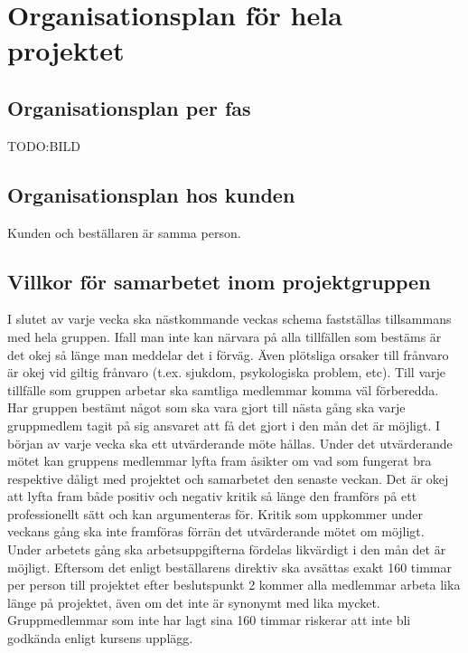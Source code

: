 \documentclass{article}
\begin{document}
\section{Organisationsplan för hela projektet}

\subsection{Organisationsplan per fas}
TODO:BILD

\subsection{Organisationsplan hos kunden}
Kunden och beställaren är samma person.

\subsection{Villkor för samarbetet inom projektgruppen}
I slutet av varje vecka ska nästkommande veckas schema fastställas tillsammans med hela gruppen. Ifall man inte kan närvara på alla tillfällen som bestäms är det okej så länge man meddelar det i förväg. Även plötsliga orsaker till frånvaro är okej vid giltig frånvaro (t.ex. sjukdom, psykologiska problem, etc).
\newline\newline
Till varje tillfälle som gruppen arbetar ska samtliga medlemmar komma väl förberedda. Har gruppen bestämt något som ska vara gjort till nästa gång ska varje gruppmedlem tagit på sig ansvaret att få det gjort i den mån det är möjligt.
\newline\newline
I början av varje vecka ska ett utvärderande möte hållas. Under det utvärderande mötet kan gruppens medlemmar lyfta fram åsikter om vad som fungerat bra respektive dåligt med projektet och samarbetet den senaste veckan. Det är okej att lyfta fram både positiv och negativ kritik så länge den framförs på ett professionellt sätt och kan argumenteras för. Kritik som uppkommer under veckans gång ska inte framföras förrän det utvärderande mötet om möjligt.
\newline\newline
Under arbetets gång ska arbetsuppgifterna fördelas likvärdigt i den mån det är möjligt. Eftersom det enligt beställarens direktiv ska avsättas exakt 160 timmar per person till projektet efter beslutspunkt 2 kommer alla medlemmar arbeta lika länge på projektet, även om det inte är synonymt med lika mycket. Gruppmedlemmar som inte har lagt sina 160 timmar riskerar att inte bli godkända enligt kursens upplägg.
\end{document}
